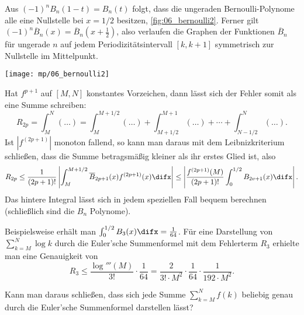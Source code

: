   \begin{antwort}
    Aus $(-1)^n B_n (1-t)=B_n(t)$ folgt, 
    dass die ungeraden Bernoulli-Polynome alle eine Nullstelle 
    bei $x=1/2$ besitzen, \sieheAbbildung\ref{fig:06_bernoulli2}.  
    Ferner gilt $(-1)^n\overline{B}_n (x)=\overline{B}_n (x+\frac{1}{2})$, 
    also verlaufen die Graphen der Funktionen $\overline{B}_n$ 
    für ungerade $n$ auf jedem Periodizitätsintervall $[k,k+1]$ 
    symmetrisch zur Nullstelle im Mittelpunkt. 

    \begin{center}
      \texttt{[image: mp/06\_bernoulli2]}
      \label{fig:06_bernoulli2}
    \end{center}

    Hat $f^{p+1}$ auf $[M,N]$ konstantes Vorzeichen, dann 
    lässt sich der Fehler somit als eine 
     Summe schreiben:
    \[
    R_{2p} = \int_M^N (\ldots) = 
    \int_M^{M+1/2} (\ldots) +
    \int_{M+1/2}^{M+1} (\ldots) + \cdots + 
    \int_{N-1/2}^N (\ldots).
    \] 
    Ist $\left|f^{(2p+1)}\right|$ monoton fallend, so kann man daraus mit dem 
    Leibnizkriterium schließen, dass die Summe betragsmäßig 
    kleiner als ihr erstes Glied ist, also
    \[
    R_{2p} 
    \le \frac{1}{(2p+1)!}
    \left| \int_{M}^{M+1/2} \overline{B}_{2p+1}(x) 
      f^{(2p+1)}(x) \difx \right| \le \left| \frac{f^{(2p+1)}(M)}{(2p+1)!} 
      \int_0^{1/2} B_{2v+1}(x) \difx \right|.
    \]
    Das hintere Integral lässt sich in jedem speziellen 
    Fall bequem berechnen (schließlich sind die $B_n$ Polynome). 

    Beispielsweise erhält man $\int_0^{1/2}B_3(x)\difx = \frac{1}{64}$. 
    Für eine Darstellung von $\sum_{k=M}^N \log k$ durch die Euler'sche 
    Summenformel mit dem Fehlerterm $R_3$ erhielte man eine Genauigkeit von
    \[
    R_3 \le \frac{\log'''(M)}{3!} \cdot \frac{1}{64} = 
    \frac{2}{3!\cdot M^2} \cdot \frac{1}{64} \cdot \frac{1}{192 \cdot M^2}.
    \]
    \AntEnd
  \end{antwort}

  \begin{frage}
    Kann man daraus schließen, dass sich jede Summe $\sum_{k=M}^N f(k)$ 
    beliebig genau durch die Euler'sche Summenformel darstellen lässt?
  \end{frage}

